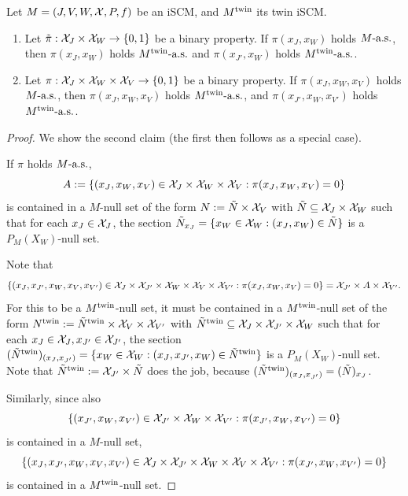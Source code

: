 \begin{Lem}\label{lem:scm_twin_nullsets}
  Let $M = \left ( J, V, W, \mathcal{X}, P, f \right )$ be an iSCM, and $M^{\mathrm{twin}}$ its twin iSCM.
  \begin{enumerate}
    \item Let $\tilde\pi : \mathcal{X}_J \times \mathcal{X}_W \to \{0,1\}$ be a binary property.
      If $\pi(x_J,x_W)$ holds $M\text{-a.s.}$, then $\pi(x_J,x_W)$ holds $M^{\mathrm{twin}}\text{-a.s.}$ and $\pi(x_{J'},x_W)$ holds $M^{\mathrm{twin}}\text{-a.s.}$.
    \item Let $\pi : \mathcal{X}_J \times \mathcal{X}_W \times \mathcal{X}_V \to \{0,1\}$ be a binary property.
      If $\pi(x_J,x_W,x_V)$ holds $M\text{-a.s.}$, then $\pi(x_J,x_W,x_V)$ holds $M^{\mathrm{twin}}\text{-a.s.}$, and $\pi(x_{J'},x_W,x_{V'})$ holds $M^{\mathrm{twin}}\text{-a.s.}$.
  \end{enumerate}
\end{Lem}
\begin{proof}
  We show the second claim (the first then follows as a special case).

  If $\pi$ holds $M\text{-a.s.}$,
  $$A := \{(x_J,x_W,x_V) \in \mathcal{X}_J \times \mathcal{X}_W \times \mathcal{X}_V : \pi(x_J,x_W,x_V) = 0\}$$
  is contained in a $M$-null set of the form $N := \tilde{N} \times \mathcal{X}_V$ with $\tilde{N} \subseteq \mathcal{X}_J \times \mathcal{X}_W$ such that for each $x_J \in \mathcal{X}_J$, the section $\tilde{N}_{x_J} = \{x_W \in \mathcal{X}_W : (x_J,x_W) \in \tilde{N}\}$ is a $P_M(X_W)$-null set.

  Note that
  $$\{(x_J,x_{J'},x_W,x_V,x_{V'}) \in \mathcal{X}_J \times \mathcal{X}_{J'} \times \mathcal{X}_W \times \mathcal{X}_V \times \mathcal{X}_{V'} : \pi(x_J,x_W,x_V) = 0\} = \mathcal{X}_{J'} \times A \times \mathcal{X}_{V'}.$$
  For this to be a $M^{\mathrm{twin}}$-null set, it must be contained in a $M^{\mathrm{twin}}$-null set of the form $N^{\mathrm{twin}} := \tilde{N}^{\mathrm{twin}} \times \mathcal{X}_{V} \times \mathcal{X}_{V'}$ with $\tilde{N}^{\mathrm{twin}} \subseteq \mathcal{X}_{J} \times \mathcal{X}_{J'} \times \mathcal{X}_W$ such that for each $x_J \in \mathcal{X}_J, x_{J'} \in \mathcal{X}_{J'}$, the section $(\tilde{N}^{\mathrm{twin}})_{(x_J,x_{J'})} = \{x_W \in \mathcal{X}_W : (x_J,x_{J'},x_W) \in \tilde{N}^{\mathrm{twin}}\}$ is a $P_M(X_W)$-null set.
  Note that $\tilde{N}^{\mathrm{twin}} := \mathcal{X}_{J'} \times \tilde{N}$ does the job, because $(\tilde{N}^{\mathrm{twin}})_{(x_J,x_{J'})} = (\tilde{N})_{x_J}$.

  Similarly, since also
  $$\{(x_{J'},x_W,x_{V'}) \in \mathcal{X}_{J'} \times \mathcal{X}_W \times \mathcal{X}_{V'} : \pi(x_{J'},x_W,x_{V'}) = 0\}$$
  is contained in a $M$-null set,
  $$\{(x_J,x_{J'},x_W,x_V,x_{V'}) \in \mathcal{X}_J \times \mathcal{X}_{J'} \times \mathcal{X}_W \times \mathcal{X}_V \times \mathcal{X}_{V'} : \pi(x_{J'},x_W,x_{V'}) = 0\}$$
  is contained in a $M^{\mathrm{twin}}$-null set.
\end{proof}

